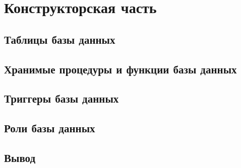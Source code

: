 \chapter{Конструкторская часть}

\section{Таблицы базы данных}

\section{Хранимые процедуры и функции базы данных}

\section{Триггеры базы данных}

\section{Роли базы данных}

\section*{Вывод}
